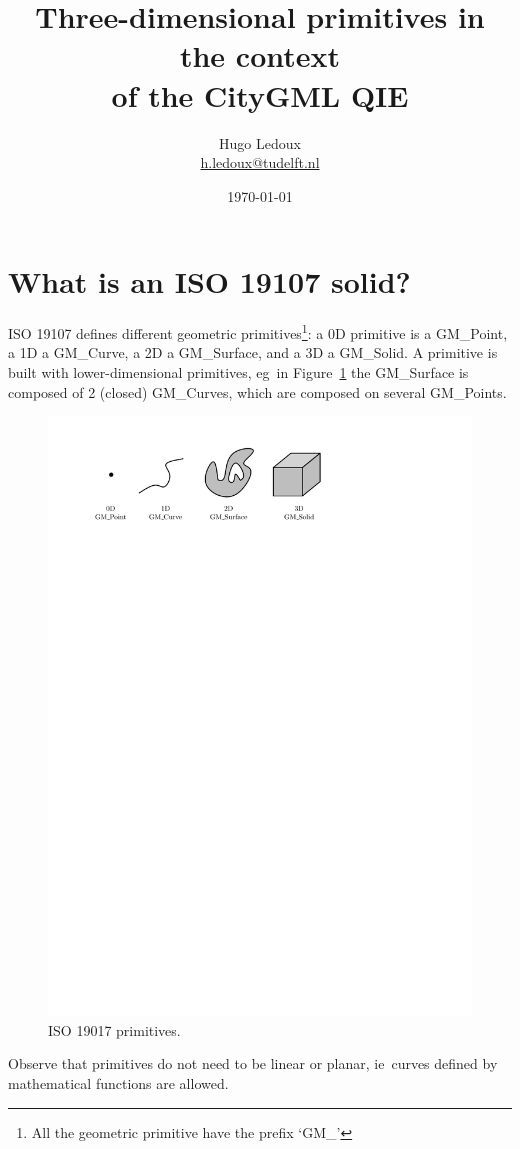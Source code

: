 \documentclass[a4paper,parskip=half,11pt]{scrartcl}
\title{Three-dimensional primitives in the context\\ of the CityGML QIE}
\author{Hugo Ledoux\\ \url{h.ledoux@tudelft.nl}}
\date{\today}
\newcommand{\ie}{ie}
\newcommand{\eg}{eg}
\begin{document}
\maketitle



%
\section{What is an ISO 19107 solid?}

ISO 19107 defines different geometric primitives\footnote{All the geometric primitive have the prefix `GM\_'}: a 0D primitive is a GM\_Point, a 1D a GM\_Curve, a 2D a GM\_Surface, and a 3D a GM\_Solid.
A primitive is built with lower-dimensional primitives, \eg\ in Figure~\ref{fig:isoprimitives} the GM\_Surface is composed of 2 (closed) GM\_Curves, which are composed on several GM\_Points.
\begin{figure}
  \centering
  \includegraphics[width=0.8\linewidth]{figs/isoprimitives.pdf}
  \caption{ISO 19017 primitives.}
\label{fig:isoprimitives}
\end{figure}
Observe that primitives do not need to be linear or planar, \ie\ curves defined by mathematical functions are allowed.
\end{document}
